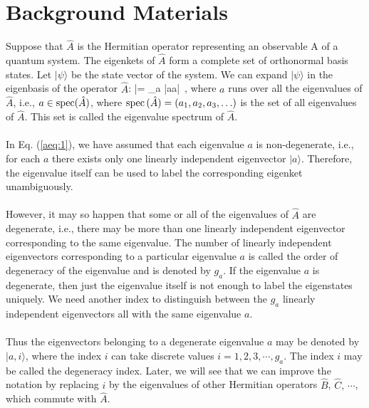 

\section{Background Materials}
Suppose that $\hat{A}$ is the Hermitian operator representing an observable A of a quantum system. The eigenkets of ${\hat A}$
form a complete set of orthonormal basis states. Let $|\psi\rangle$ be the state vector of the system. We can expand 
$|\psi\rangle$ in the eigenbasis of the operator ${\hat A}$:
\be
|\psi\rangle = \sum_a |a\rangle \langle a|\psi\rangle \, , 
\label{aeq:1}
\ee
where $a$ runs over all the eigenvalues of ${\hat A}$, i.e., $a\in {\rm spec}(\hat{A})$, where ${\rm spec}\,(\hat{A}) =
(a_1,a_2, a_3, \ldots )$ is the set of all eigenvalues of $\hat{A}$. This set is called the eigenvalue spectrum of $\hat{A}$.


\paragraph{}
In Eq. (\ref{aeq:1}), we have assumed that each eigenvalue $a$ is non-degenerate, i.e., for each $a$ there exists only one linearly independent eigenvector $|a\rangle$. Therefore, the eigenvalue itself can be used to label the corresponding eigenket unambiguously.

\paragraph{}
However, it may so happen that some or all of the eigenvalues of ${\hat A}$ are degenerate, i.e., there may be more than one linearly independent eigenvector corresponding to the same eigenvalue. The number of linearly independent eigenvectors corresponding
to a particular eigenvalue $a$ is called the order of degeneracy of the eigenvalue and is denoted by $g_a$. If the eigenvalue $a$ is degenerate, then just the eigenvalue itself is not enough to label the eigenstates uniquely. We need another index to distinguish between the $g_a$ linearly independent eigenvectors all with the same eigenvalue $a$.

\paragraph{}
Thus the eigenvectors belonging to a degenerate eigenvalue $a$ may be denoted by $|a,i\rangle$, where the index $i$ 
can take discrete values $i=1,2,3, \cdots , g_a$. The index $i$ may be called the degeneracy index. Later, we will see that we can improve the notation by replacing $i$ by the eigenvalues of other Hermitian operators $\hat{B}$, $\hat{C},\, \cdots$, which commute
with $\hat{A}$. 

